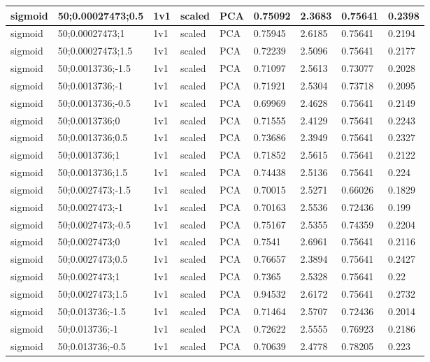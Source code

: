 \begin{longtable}{lllllllll}
sigmoid & 50;0.00027473;0.5 & 1v1 & scaled & PCA & 0.75092 & 2.3683 & 0.75641 & 0.2398\\ \hline
sigmoid & 50;0.00027473;1 & 1v1 & scaled & PCA & 0.75945 & 2.6185 & 0.75641 & 0.2194\\ \hline
sigmoid & 50;0.00027473;1.5 & 1v1 & scaled & PCA & 0.72239 & 2.5096 & 0.75641 & 0.2177\\ \hline
sigmoid & 50;0.0013736;-1.5 & 1v1 & scaled & PCA & 0.71097 & 2.5613 & 0.73077 & 0.2028\\ \hline
sigmoid & 50;0.0013736;-1 & 1v1 & scaled & PCA & 0.71921 & 2.5304 & 0.73718 & 0.2095\\ \hline
sigmoid & 50;0.0013736;-0.5 & 1v1 & scaled & PCA & 0.69969 & 2.4628 & 0.75641 & 0.2149\\ \hline
sigmoid & 50;0.0013736;0 & 1v1 & scaled & PCA & 0.71555 & 2.4129 & 0.75641 & 0.2243\\ \hline
sigmoid & 50;0.0013736;0.5 & 1v1 & scaled & PCA & 0.73686 & 2.3949 & 0.75641 & 0.2327\\ \hline
sigmoid & 50;0.0013736;1 & 1v1 & scaled & PCA & 0.71852 & 2.5615 & 0.75641 & 0.2122\\ \hline
sigmoid & 50;0.0013736;1.5 & 1v1 & scaled & PCA & 0.74438 & 2.5136 & 0.75641 & 0.224\\ \hline
sigmoid & 50;0.0027473;-1.5 & 1v1 & scaled & PCA & 0.70015 & 2.5271 & 0.66026 & 0.1829\\ \hline
sigmoid & 50;0.0027473;-1 & 1v1 & scaled & PCA & 0.70163 & 2.5536 & 0.72436 & 0.199\\ \hline
sigmoid & 50;0.0027473;-0.5 & 1v1 & scaled & PCA & 0.75167 & 2.5355 & 0.74359 & 0.2204\\ \hline
sigmoid & 50;0.0027473;0 & 1v1 & scaled & PCA & 0.7541 & 2.6961 & 0.75641 & 0.2116\\ \hline
sigmoid & 50;0.0027473;0.5 & 1v1 & scaled & PCA & 0.76657 & 2.3894 & 0.75641 & 0.2427\\ \hline
sigmoid & 50;0.0027473;1 & 1v1 & scaled & PCA & 0.7365 & 2.5328 & 0.75641 & 0.22\\ \hline
sigmoid & 50;0.0027473;1.5 & 1v1 & scaled & PCA & 0.94532 & 2.6172 & 0.75641 & 0.2732\\ \hline
sigmoid & 50;0.013736;-1.5 & 1v1 & scaled & PCA & 0.71464 & 2.5707 & 0.72436 & 0.2014\\ \hline
sigmoid & 50;0.013736;-1 & 1v1 & scaled & PCA & 0.72622 & 2.5555 & 0.76923 & 0.2186\\ \hline
sigmoid & 50;0.013736;-0.5 & 1v1 & scaled & PCA & 0.70639 & 2.4778 & 0.78205 & 0.223\\ \hline

\end{longtable}
